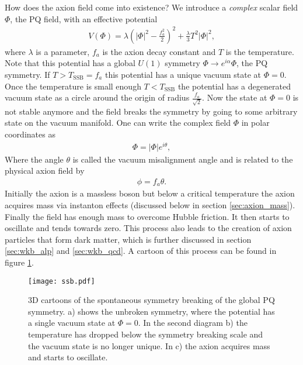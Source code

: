 \documentclass[twoside,a4paper, 12pt]{article}
\numberwithin{equation}{section}
\begin{document}
How does the axion field come into existence?
We introduce a \emph{complex} scalar field $\Phi$, the PQ field, with an effective potential \cite[Eq. 2]{StringFits}
\begin{align}
    \label{eq:SSB_potential}
    V(\Phi) = \lambda \left( |\Phi|^2 - \frac{f_a^2}{2} \right)^2 + \frac{\lambda}{3} T^2 |\Phi|^2,
\end{align}
where $\lambda$ is a parameter, $f_a$ is the axion decay constant and
$T$ is the temperature.
Note that this potential has a global $U(1)$ symmetry $\Phi \rightarrow e^{i \alpha} \Phi$, the PQ symmetry.
If $T > T_\mathrm{SSB} = f_a$ this potential has a unique vacuum state at $\Phi = 0$.
Once the temperature is small enough $T < T_\mathrm{SSB}$ the potential
has a degenerated vacuum state as a circle around the origin of radius $\frac{f_a}{\sqrt{2}}$.
Now the state at $\Phi = 0$ is not stable anymore and the field
breaks the symmetry by going to some arbitrary state on the vacuum manifold.
One can write the complex field $\Phi$ in polar coordinates as
\begin{align}
    \Phi = |\Phi| e^{i \theta},
\end{align}
Where the angle $\theta$ is called the vacuum misalignment angle
and is related to the physical axion field by
\begin{align}
    \label{eq:axion_theta}
    \phi = f_a \theta.
\end{align}
Initially the axion is a massless boson but below a critical temperature
the axion acquires mass via instanton effects (discussed below in section \ref{sec:axion_mass}).
Finally the field has enough mass to overcome Hubble friction.
It then starts to oscillate and tends towards zero.
This process also leads to the creation of axion particles that form dark
matter, which is further discussed in section \ref{sec:wkb_alp} and
\ref{sec:wkb_qcd}.
A cartoon of this process can be found in figure \ref{fig:ssb}.
\begin{figure}
    \centering
    \texttt{[image: ssb.pdf]}
    \caption{
    3D cartoons of the spontaneous symmetry breaking of the global PQ symmetry.
    a) shows the unbroken symmetry, where the 
    potential has a single vacuum state at $\Phi = 0$.
    In the second diagram b) the temperature has dropped below the symmetry breaking scale and the vacuum state is no longer unique.
    In c) the axion acquires mass and starts to oscillate.
    }
    \label{fig:ssb}
\end{figure}
\end{document}

